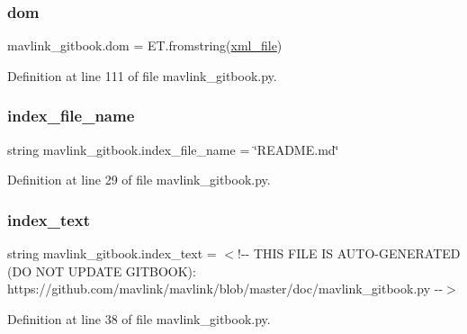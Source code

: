 \subsubsection{\texorpdfstring{dom}{dom}}
{\footnotesize\ttfamily mavlink\+\_\+gitbook.\+dom = E\+T.\+fromstring(\mbox{\hyperlink{namespacemavlink__gitbook_ac775536f765d6de771c4504a54332d8b}{xml\+\_\+file}})}



Definition at line 111 of file mavlink\+\_\+gitbook.\+py.

\mbox{\label{namespacemavlink__gitbook_a62c09309bc68b41990e44200c18351c5}} 
\subsubsection{\texorpdfstring{index\_file\_name}{index\_file\_name}}
{\footnotesize\ttfamily string mavlink\+\_\+gitbook.\+index\+\_\+file\+\_\+name = \char`\"{}R\+E\+A\+D\+M\+E.\+md\char`\"{}}



Definition at line 29 of file mavlink\+\_\+gitbook.\+py.

\mbox{\label{namespacemavlink__gitbook_a03742fa597e2b6b6fa05847955012350}} 
\subsubsection{\texorpdfstring{index\_text}{index\_text}}
{\footnotesize\ttfamily string mavlink\+\_\+gitbook.\+index\+\_\+text = \textquotesingle{}$<$!-\/-\/ T\+H\+IS F\+I\+LE IS A\+U\+TO-\/G\+E\+N\+E\+R\+A\+T\+ED (DO N\+OT U\+P\+D\+A\+TE G\+I\+T\+B\+O\+OK)\+: https\+://github.\+com/mavlink/mavlink/blob/master/doc/mavlink\+\_\+gitbook.\+py -\/-\/$>$\textquotesingle{}}



Definition at line 38 of file mavlink\+\_\+gitbook.\+py.

\mbox{\label{namespacemavlink__gitbook_a539be0135e50ed256965d635c039bbdf}} 
